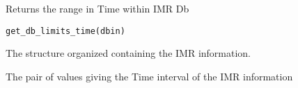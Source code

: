 %
\begin{Description}\relax
Returns the range in Time within IMR Db
\end{Description}
%
\begin{Usage}
\begin{verbatim}
get_db_limits_time(dbin)
\end{verbatim}
\end{Usage}
%
\begin{Arguments}
\begin{ldescription}
\item[\code{dbin}] 
The  structure organized containing the IMR
information.

\end{ldescription}
\end{Arguments}
%
\begin{Value}
The pair of values giving the Time interval of the IMR information
\end{Value}
